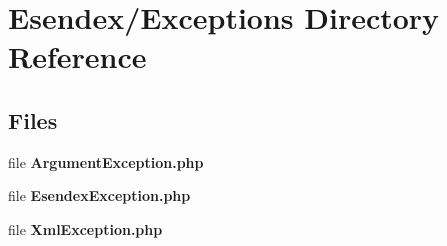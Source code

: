 \section{Esendex/\-Exceptions Directory Reference}
\label{dir_5f463af08b0151b6acdb02b8cdfffaf9}
\subsection*{Files}
\begin{DoxyCompactItemize}
\item 
file {\bfseries Argument\-Exception.\-php}
\item 
file {\bfseries Esendex\-Exception.\-php}
\item 
file {\bfseries Xml\-Exception.\-php}
\end{DoxyCompactItemize}
